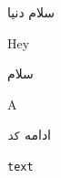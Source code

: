 \documentclass{article}
\begin{document}
    سلام دنیا

    Hey

  {  \latinttfamily

    سلام

    A
}

ادامه
\verb|کد|

\verb*|text|
\end{document}

